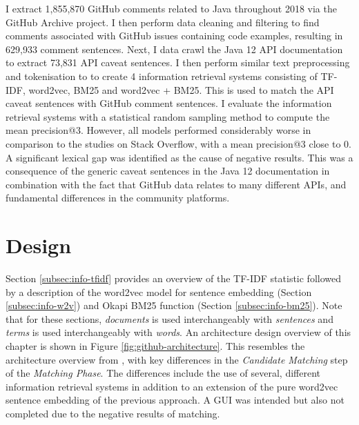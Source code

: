 I extract 1,855,870 GitHub comments related to Java throughout 2018 via the GitHub Archive project. I then perform data cleaning and filtering to find comments associated with GitHub issues containing code examples, resulting in 629,933 comment sentences. Next, I data crawl the Java 12 API documentation to extract 73,831 API caveat sentences. I then perform similar text preprocessing and tokenisation to \cite{jiamou} to create 4 information retrieval systems consisting of TF-IDF, word2vec, BM25 and word2vec + BM25. This is used to match the API caveat sentences with GitHub comment sentences. I evaluate the information retrieval systems with a statistical random sampling method to compute the mean precision@3. However, all models performed considerably worse in comparison to the studies on Stack Overflow, with a mean precision@3 close to 0. A significant lexical gap was identified as the cause of negative results. This was a consequence of the generic caveat sentences in the Java 12 documentation in combination with the fact that GitHub data relates to many different APIs, and fundamental differences in the community platforms.

\section{Design}
\label{sec:info-design}
Section \ref{subsec:info-tfidf} provides an overview of the TF-IDF statistic followed by a description of the word2vec model for sentence embedding (Section \ref{subsec:info-w2v}) and Okapi BM25 function (Section \ref{subsec:info-bm25}). Note that for these sections, \textit{documents} is used interchangeably with \textit{sentences} and \textit{terms} is used interchangeably with \textit{words}. An architecture design overview of this chapter is shown in Figure \ref{fig:github-architecture}. This resembles the architecture overview from \cite{jiamou}, with key differences in the \textit{Candidate Matching} step of the \textit{Matching Phase}. The differences include the use of several, different information retrieval systems in addition to an extension of the pure word2vec sentence embedding of the previous approach. A GUI was intended but also not completed due to the negative results of matching.

